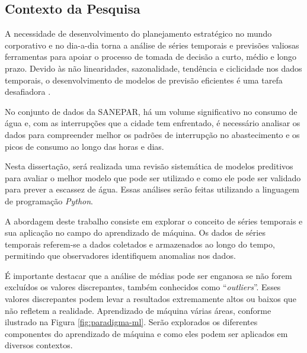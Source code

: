 \subsection{Contexto da Pesquisa} \label{subsec:contexto}
A necessidade de desenvolvimento do planejamento estratégico no mundo corporativo e no dia-a-dia torna a análise de séries temporais e previsões valiosas ferramentas para apoiar o processo de tomada de decisão a curto, médio e longo prazo. Devido às não linearidades, sazonalidade, tendência e ciclicidade nos dados temporais, o desenvolvimento de modelos de previsão eficientes é uma tarefa desafiadora \cite{mateus}.

No conjunto de dados da SANEPAR, há um volume significativo no consumo de água e, com as interrupções que a cidade tem enfrentado, é necessário analisar os dados para compreender melhor os padrões de interrupção no abastecimento e os picos de consumo ao longo das horas e dias.

Nesta dissertação, será realizada uma revisão sistemática de modelos preditivos para avaliar o melhor modelo que pode ser utilizado e como ele pode ser validado para prever a escassez de água. Essas análises serão feitas utilizando a linguagem de programação \textit{Python}.

A abordagem deste trabalho consiste em explorar o conceito de séries temporais e sua aplicação no campo do aprendizado de máquina. Os dados de séries temporais referem-se a dados coletados e armazenados ao longo do tempo, permitindo que observadores identifiquem anomalias nos dados.

É importante destacar que a análise de médias pode ser enganosa se não forem excluídos os valores discrepantes, também conhecidos como ``\textit{outliers}''. Esses valores discrepantes podem levar a resultados extremamente altos ou baixos que não refletem a realidade.
Aprendizado de máquina várias áreas, conforme ilustrado na Figura \ref{fig:paradigma-ml}. Serão explorados os diferentes componentes do aprendizado de máquina e como eles podem ser aplicados em diversos contextos.
 
